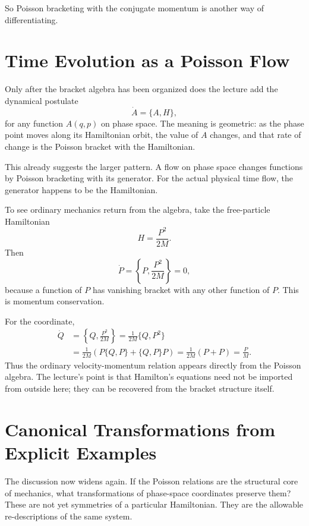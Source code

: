 So Poisson bracketing with the conjugate momentum is another way of differentiating.

\section{Time Evolution as a Poisson Flow}

Only after the bracket algebra has been organized does the lecture add the dynamical postulate
\begin{equation}
\dot A=\{A,H\},
\end{equation}
for any function \(A(q,p)\) on phase space. The meaning is geometric: as the phase point moves along its Hamiltonian orbit, the value of \(A\) changes, and that rate of change is the Poisson bracket with the Hamiltonian.

This already suggests the larger pattern. A flow on phase space changes functions by Poisson bracketing with its generator. For the actual physical time flow, the generator happens to be the Hamiltonian.

To see ordinary mechanics return from the algebra, take the free-particle Hamiltonian
\begin{equation}
H=\frac{P^2}{2M}.
\end{equation}
Then
\begin{equation}
\dot P=\left\{P,\frac{P^2}{2M}\right\}=0,
\end{equation}
because a function of \(P\) has vanishing bracket with any other function of \(P\). This is momentum conservation.

For the coordinate,
\begin{align}
\dot Q
&=\left\{Q,\frac{P^2}{2M}\right\}
 =\frac{1}{2M}\{Q,P^2\} \\
&=\frac{1}{2M}\left(P\{Q,P\}+\{Q,P\}P\right)
 =\frac{1}{2M}(P+P)
 =\frac{P}{M}.
\end{align}
Thus the ordinary velocity-momentum relation appears directly from the Poisson algebra. The lecture's point is that Hamilton's equations need not be imported from outside here; they can be recovered from the bracket structure itself.

\section{Canonical Transformations from Explicit Examples}

The discussion now widens again. If the Poisson relations are the structural core of mechanics, what transformations of phase-space coordinates preserve them? These are not yet symmetries of a particular Hamiltonian. They are the allowable re-descriptions of the same system.

